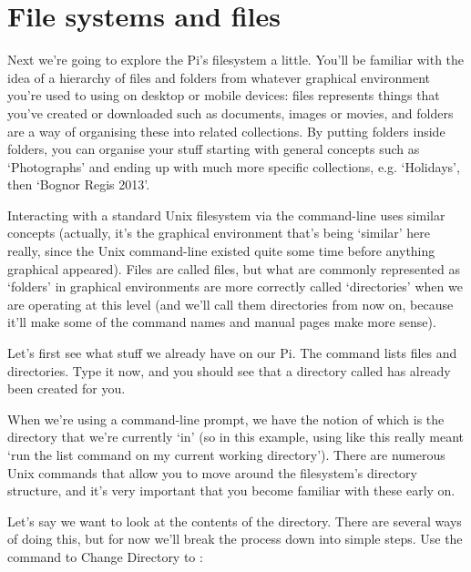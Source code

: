\section{File systems and files}

Next we're going to explore the Pi's filesystem a little. You'll be familiar with the idea of a hierarchy of files and folders from whatever graphical environment you're used to using on desktop or mobile devices: files represents things that you've created or downloaded such as documents, images or movies, and folders are a way of organising these into related collections. By putting folders inside folders, you can organise your stuff starting with general concepts such as `Photographs' and ending up with much more specific collections, e.g. `Holidays', then `Bognor Regis 2013'.

Interacting with a standard Unix filesystem via the command-line uses similar concepts (actually, it's the graphical environment that's being `similar' here really, since the Unix command-line existed quite some time before anything graphical appeared). Files are called files, but what are commonly represented as `folders' in graphical environments are more correctly called `directories' when we are operating at this level (and we'll call them directories from now on, because it'll make some of the command names and manual pages make more sense).

Let's first see what stuff we already have on our Pi. The  command lists files and directories. Type it now, and you should see that a directory called  has already been created for you.



When we're using a command-line prompt, we have the notion of  which is the directory that we're currently `in' (so in this example, using  like this really meant `run the list command on my current working directory'). There are numerous Unix commands that allow you to move around the filesystem's directory structure, and it's very important that you become familiar with these early on.

Let's say we want to look at the contents of the  directory. There are several ways of doing this, but for now we'll break the process down into simple steps. Use the  command to Change Directory to :

